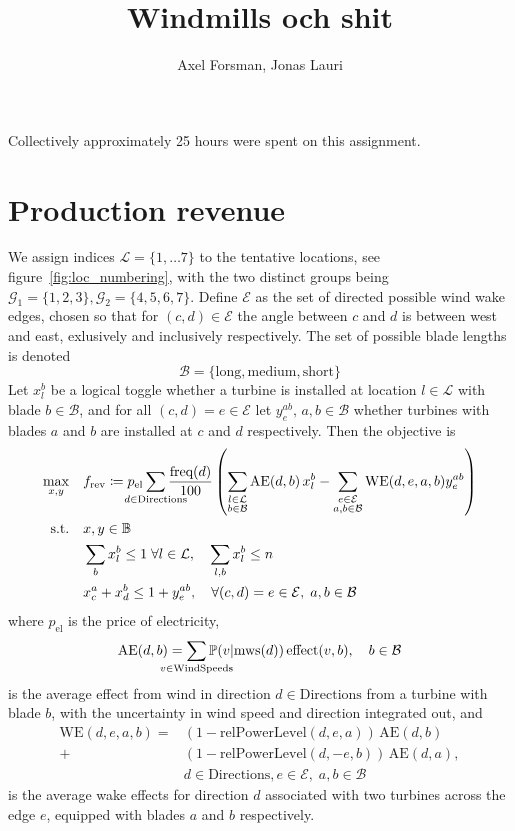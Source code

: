 \documentclass{article}
\title{Windmills och shit}
\author{Axel Forsman, Jonas Lauri}
\begin{document}
\maketitle
Collectively approximately 25 hours were spent on this assignment.

\section{Production revenue}\label{sec:prod_revenue}

We assign indices $\mathcal L = \{1, \ldots 7\}$ to the tentative locations,
see figure~\ref{fig:loc_numbering}, with the two distinct groups being
$ \mathcal G_1 = \{1, 2, 3\}, \mathcal G_2 = \{4, 5, 6, 7\}$.
Define $\mathcal E$ as the set of directed possible wind wake edges,
chosen so that for $(c, d) \in \mathcal E$ the angle between $c$ and $d$
is between west and east, exlusively and inclusively respectively.
The set of possible blade lengths is denoted
$$ \mathcal B = \{\text{long}, \text{medium}, \text{short}\} $$
Let $x_l^b$ be a logical toggle whether
a turbine is installed at location $l \in \mathcal L$
with blade $b \in \mathcal B$,
and for all $(c, d) = e \in \mathcal E$ let $y_e^{ab}, \, a, b \in \mathcal B$
whether turbines with blades $a$ and $b$ are installed at $c$ and $d$ respectively.
Then the objective is
\begin{equation*}
	\begin{aligned}
		\max_{x, y} \quad & f_\text{rev} \coloneqq p_\text{el}\sum_{\mathclap{d \in \text{Directions}}} \frac{\text{freq}(d)}{100} \left( \sum_{\substack{l \in \mathcal L \\ b \in \mathcal B}} \text{AE}(d, b) \, x_l^b - \sum_{\substack{e \in \mathcal E \\ a,b \in \mathcal B}} \text{WE}(d, e, a, b) y_e^{ab} \right) \\
        \text{s.t.} \quad & x, y \in \mathbb B \\
		& \sum_b x_l^b \le 1 \; \forall l \in \mathcal L, \quad \sum_{l, b} x_l^b \le n \\
& x_c^a + x_d^b \le 1 + y_e^{ab}, \quad \forall (c, d) = e \in \mathcal E, \; a, b \in \mathcal B
    \end{aligned}
\end{equation*}
where $p_\text{el}$ is the price of electricity,
$$ \text{AE}(d, b) = \sum_{\mathclap{v \in \text{WindSpeeds}}} \mathbb P(v \vert \text{mws}(d)) \, \text{effect}(v, b), \quad b \in \mathcal B $$
is the average effect from wind in direction $d \in \text{Directions}$
from a turbine with blade $b$,
with the uncertainty in wind speed and direction integrated out, and
\begin{align*}
	\text{WE}(d, e, a, b) = &(1 - \text{relPowerLevel}(d, e, a)) \, \text{AE}(d, b) \\
	+ &(1 - \text{relPowerLevel}(d, -e, b)) \, \text{AE}(d, a), \\
	& d \in \text{Directions}, e \in \mathcal E, \; a,b \in \mathcal B
\end{align*}
is the average wake effects for direction $d$ associated with two turbines
across the edge $e$, equipped with blades $a$ and $b$ respectively.
\end{document}
